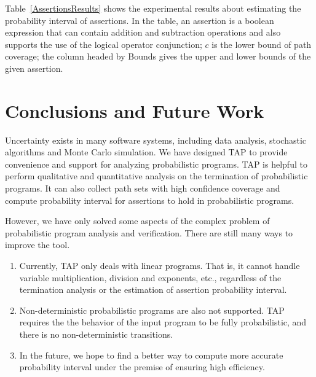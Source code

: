 \documentclass[sigconf,review, anonymous]{acmart}
\begin{document}
Table~\ref{AssertionsResults} shows the experimental results about estimating the probability interval of assertions. In the table, an assertion is a boolean expression that can contain addition and subtraction operations and  also supports the use of the logical operator conjunction; $c$ is the lower bound of path coverage; the column headed by Bounds gives the upper and lower bounds of the given assertion. %



\section{Conclusions and Future Work}
Uncertainty exists in many software systems, including data analysis, stochastic algorithms and Monte Carlo simulation. We have designed TAP  to provide convenience and support for analyzing probabilistic programs.
TAP is helpful to perform qualitative and quantitative analysis on the termination of probabilistic programs. It can also collect path sets with high confidence coverage and compute  probability interval for assertions to hold in probabilistic programs.


However, we have only solved some aspects of the complex problem of probabilistic program analysis and verification. There are still many ways to improve the tool.
\begin{enumerate}
	\item Currently, TAP only deals with linear programs. That is, it cannot handle variable multiplication, division and exponents, etc., regardless of the termination analysis or the estimation of assertion probability interval.
	\item Non-deterministic probabilistic programs  are also not supported. TAP requires the the behavior of the input program to be fully probabilistic, and there is no non-deterministic transitions. 
	\item In the future, we hope to find a better way to compute more accurate probability interval under the premise of ensuring high efficiency. 
\end{enumerate}




\end{document}
